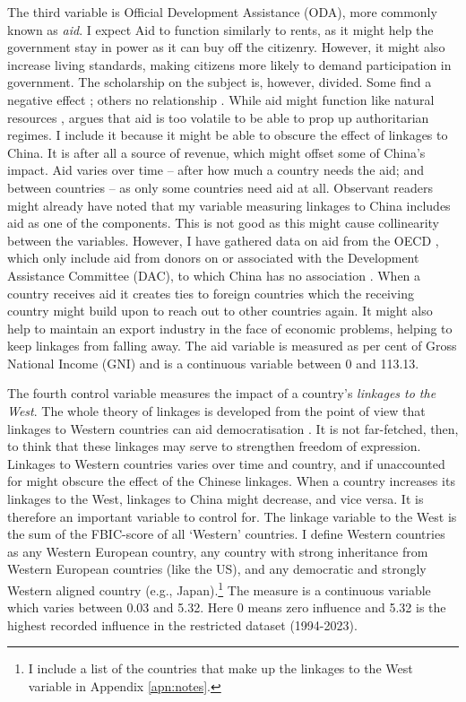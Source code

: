 The third variable is Official Development Assistance (ODA), more commonly known as \textit{aid}. I expect Aid to function similarly to rents, as it might help the government stay in power as it can buy off the citizenry. However, it might also increase living standards, making citizens more likely to demand participation in government. The scholarship on the subject is, however, divided. Some find a negative effect \citep{djankov_curse_2008}; others no relationship \citep{altincekic_why_2014}. While aid might function like natural resources \citep{djankov_curse_2008}, \citet[p. 30]{altincekic_why_2014} argues that aid is too volatile to be able to prop up authoritarian regimes. I include it because it might be able to obscure the effect of linkages to China. It is after all a source of revenue, which might offset some of China's impact. Aid varies over time -- after how much a country needs the aid; and between countries -- as only some countries need aid at all. Observant readers might already have noted that my variable measuring linkages to China includes aid as one of the components. This is not good as this might cause collinearity between the variables. However, I have gathered data on aid from the OECD \citep{oecd_dac2a_2025}, which only include aid from donors on or associated with the Development Assistance Committee (DAC), to which China has no association \citep{oecd_development_2025}. When a country receives aid it creates ties to foreign countries which the receiving country might build upon to reach out to other countries again. It might also help to maintain an export industry in the face of economic problems, helping to keep linkages from falling away. The aid variable is measured as per cent of Gross National Income (GNI) and is a continuous variable between 0 and 113.13. 

The fourth control variable measures the impact of a country's \textit{linkages to the West}. The whole theory of linkages is developed from the point of view that linkages to Western countries can aid democratisation \citep{levitsky_linkage_2006}. It is not far-fetched, then, to think that these linkages may serve to strengthen freedom of expression. Linkages to Western countries varies over time and country, and if unaccounted for might obscure the effect of the Chinese linkages. When a country increases its linkages to the West, linkages to China might decrease, and vice versa. It is therefore an important variable to control for. The linkage variable to the West is the sum of the FBIC-score of all `Western' countries. I define Western countries as any Western European country, any country with strong inheritance from Western European countries (like the US), and any democratic and strongly Western aligned country (e.g., Japan).\footnote{I include a list of the countries that make up the linkages to the West variable in Appendix \ref{apn:notes}.} The measure is a continuous variable which varies between 0.03 and 5.32. Here 0 means zero influence and 5.32 is the highest recorded influence in the restricted dataset (1994-2023). 

